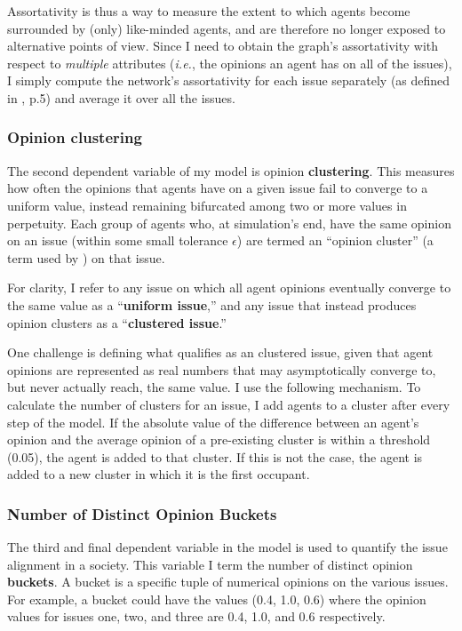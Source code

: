 Assortativity is thus a way to measure the extent to which agents become
surrounded by (only) like-minded agents, and are therefore no longer exposed to
alternative points of view. Since I need to obtain the graph's assortativity
with respect to \textit{multiple} attributes (\textit{i.e.}, the opinions an
agent has on all of the issues), I simply compute the network's assortativity
for each issue separately (as defined in \cite{newman_mixing_2003}, p.5) and
average it over all the issues.

\subsubsection{Opinion clustering}

The second dependent variable of my model is opinion \textbf{clustering}. This
measures how often the opinions that agents have on a given issue fail to
converge to a uniform value, instead remaining bifurcated among two or more
values in perpetuity. Each group of agents who, at simulation's end, have the
same opinion on an issue (within some small tolerance $\epsilon$) are termed an
``opinion cluster'' (a term used by \cite{fotakis_opinion_2016}) on that issue.

For clarity, I refer to any issue on which all agent opinions eventually
converge to the same value as a ``\textbf{uniform issue},'' and any issue that
instead produces opinion clusters as a ``\textbf{clustered issue}.''

One challenge is defining what qualifies as an clustered issue, given that
agent opinions are represented as real numbers that may asymptotically converge
to, but never actually reach, the same value. I use the following mechanism.
To calculate the number of clusters for an issue, I add agents to a cluster
after every step of the model. If the absolute value of the difference between
an agent's opinion and the average opinion of a pre-existing cluster is within
a threshold (0.05), the agent is added to that cluster. If this is not the
case, the agent is added to a new cluster in which it is the first occupant.

\subsubsection{Number of Distinct Opinion Buckets}

The third and final dependent variable in the model is used to quantify the issue alignment in a society. This variable I term the number of distinct opinion \textbf{buckets}.
A bucket is a specific tuple of numerical opinions on the various issues. For example, a bucket could have the values (0.4, 1.0, 0.6) where the opinion values for issues one, two, and three are 0.4, 1.0, and 0.6 respectively. 

